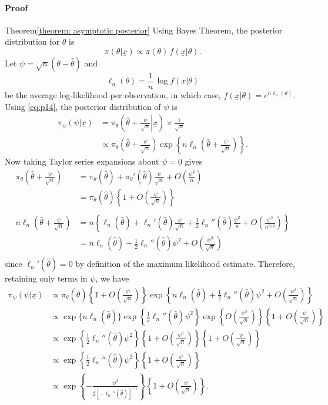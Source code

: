 \paragraph{Proof}{Theorem}{\ref{theorem: asymptotic posterior}}
Using Bayes Theorem, the posterior distribution for $\theta$ is
$$\pi(\theta|\underline{x}) \propto\pi(\theta)\,f(\underline{x}|\theta).$$
Let $\psi=\sqrt{n}(\theta-\hat\theta)$ and
$$\ell_n(\theta) =\frac{1}{n}\,\log f(\underline{x}|\theta) $$
be the average log-likelihood per observation, in which
case, $f(\underline{x}|\theta)=e^{n\ell_n(\theta)}$. Using \eqref{eq:p14},
the posterior distribution of $\psi$ is
\begin{align*}
\pi_\psi(\psi|\underline{x})
&=\pi_\theta\left(\hat\theta+\left.\frac{\psi}{\sqrt{n}}\right|\underline{x}\right)
\times\frac{1}{\sqrt{n}} \\
&\propto\pi_\theta\left(\hat\theta+\frac{\psi}{\sqrt{n}}\right)
\exp\left\{n\ell_n\left(\hat\theta+\frac{\psi}{\sqrt{n}}\right)\right\}.
\end{align*}
Now taking Taylor series expansions about $\psi=0$ gives
\begin{align*}
\pi_\theta\left(\hat\theta+\frac{\psi}{\sqrt{n}}\right)
&=\pi_\theta(\hat\theta)+
\pi_\theta'(\hat\theta)\frac{\psi}{\sqrt{n}}
+O\left(\frac{\psi^2}{n}\right) \\
&=\pi_\theta(\hat\theta)\left\{1+O\left(\frac{\psi}{\sqrt{n}}\right)\right\}
\\ \\
n\ell_n\left(\hat\theta+\frac{\psi}{\sqrt{n}}\right)
&=n\left\{\ell_n(\hat\theta)+
\ell_n'(\hat\theta)\frac{\psi}{\sqrt{n}}+
\frac{1}{2}\ell_n''(\hat\theta)\frac{\psi^2}{n}
+O\left(\frac{\psi^3}{n^{3/2}}\right)\right\} \\
&=n\ell_n(\hat\theta)+\frac{1}{2}
\ell_n''(\hat\theta)\psi^2+O\left(\frac{\psi^3}{\sqrt{n}}\right) \\
\end{align*}
since $\ell_n'(\hat\theta)=0$ by definition of the maximum likelihood
estimate. Therefore, retaining only terms in $\psi$, we have
\begin{align*}
\pi_\psi(\psi|\underline{x})
&\propto
\pi_\theta(\hat\theta)\left\{1+O\left(\frac{\psi}{\sqrt{n}}\right)\right\}
\exp\left\{n\ell_n(\hat\theta)+\frac{1}{2}
\ell_n''(\hat\theta)\psi^2+O\left(\frac{\psi^3}{\sqrt{n}}\right)\right\} \\
&\propto
\exp\{n\ell_n(\hat\theta)\}
\exp\left\{\frac{1}{2}\ell_n''(\hat\theta)\psi^2\right\}
\exp\left\{O\left(\frac{\psi^3}{\sqrt{n}}\right)\right\}
\left\{1+O\left(\frac{\psi}{\sqrt{n}}\right)\right\} \\
&\propto
\exp\left\{\frac{1}{2}\ell_n''(\hat\theta)\psi^2\right\}
\left\{1+O\left(\frac{\psi^3}{\sqrt{n}}\right)\right\}
\left\{1+O\left(\frac{\psi}{\sqrt{n}}\right)\right\} \\
&\propto
\exp\left\{\frac{1}{2}\ell_n''(\hat\theta)\psi^2\right\}
\left\{1+O\left(\frac{\psi}{\sqrt{n}}\right)\right\} \\
&\propto
\exp\left\{-\frac{\psi^2}{2[-\ell_n''(\hat\theta)]^{-1}}\right\}
\left\{1+O\left(\frac{\psi}{\sqrt{n}}\right)\right\}. 
\end{align*}
